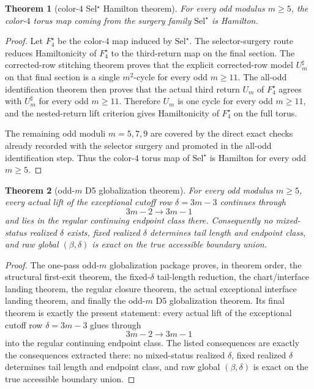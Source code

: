 \documentclass[11pt]{article}
\newtheorem{theorem}{Theorem}[section]
\newcommand{\SelStar}{\mathrm{Sel}^{\star}}
\begin{document}
\begin{theorem}[color-$4$ Sel$^{\star}$ Hamilton theorem]
\label{thm:M5-color4}
For every odd modulus $m\ge 5$, the color-$4$ torus map coming from the surgery
family $\SelStar$ is Hamilton.
\end{theorem}

\begin{proof}
Let \(F_4^\star\) be the color-$4$ map induced by \(\SelStar\).
The selector-surgery route reduces Hamiltonicity of \(F_4^\star\) to the
third-return map on the final section.
The corrected-row stitching theorem proves that the explicit corrected-row model
\(U_m^\sharp\) on that final section is a single \(m^2\)-cycle for every odd
\(m\ge 11\).
The all-odd identification theorem then proves that the actual third return
\(U_m\) of \(F_4^\star\) agrees with \(U_m^\sharp\) for every odd \(m\ge 11\).
Therefore \(U_m\) is one cycle for every odd \(m\ge 11\), and the nested-return
lift criterion gives Hamiltonicity of \(F_4^\star\) on the full torus.

The remaining odd moduli \(m=5,7,9\) are covered by the direct exact checks
already recorded with the selector surgery and promoted in the all-odd
identification step.
Thus the color-$4$ torus map of \(\SelStar\) is Hamilton for every odd
\(m\ge 5\).
\end{proof}

\begin{theorem}[odd-$m$ D5 globalization theorem]
\label{thm:M6-globalization}
For every odd modulus $m\ge 5$, every actual lift of the exceptional cutoff row
$\delta=3m-3$ continues through
\[
3m-2\to 3m-1
\]
and lies in the regular continuing endpoint class there.
Consequently no mixed-status realized $\delta$ exists, fixed realized $\delta$
determines tail length and endpoint class, and raw global $(\beta,\delta)$ is
exact on the true accessible boundary union.
\end{theorem}

\begin{proof}
The one-pass odd-$m$ globalization package proves, in theorem order, the
structural first-exit theorem, the fixed-\(\delta\) tail-length reduction, the
chart/interface landing theorem, the regular closure theorem, the actual
exceptional interface landing theorem, and finally the odd-$m$ D5 globalization
theorem.
Its final theorem is exactly the present statement: every actual lift of the
exceptional cutoff row \(\delta=3m-3\) glues through
\[
3m-2\to 3m-1
\]
into the regular continuing endpoint class.
The listed consequences are exactly the consequences extracted there: no
mixed-status realized \(\delta\), fixed realized \(\delta\) determines tail
length and endpoint class, and raw global \((\beta,\delta)\) is exact on the
true accessible boundary union.
\end{proof}
\end{document}
